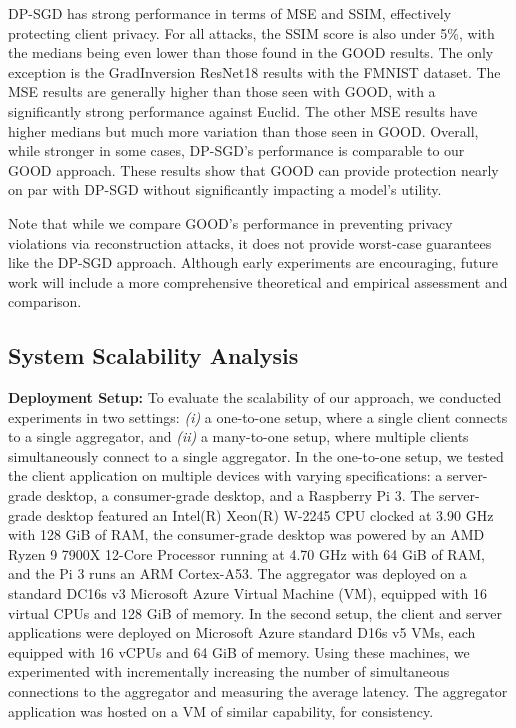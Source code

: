 {\color{black} DP-SGD has strong performance in terms of MSE and SSIM, effectively protecting client privacy. For all attacks, the SSIM score is also under 5\%, with the medians being even lower than those found in the GOOD results. The only exception is the GradInversion ResNet18 results with the FMNIST dataset. The MSE results are generally higher than those seen with GOOD, with a significantly strong performance against Euclid. The other MSE results have higher medians but much more variation than those seen in GOOD. %
Overall, while stronger in some cases, DP-SGD's performance is comparable to our GOOD approach. These results show that GOOD can provide protection nearly on par with DP-SGD without significantly impacting a model's utility.

Note that while we compare GOOD's performance in preventing privacy violations via reconstruction attacks, it does not provide worst-case guarantees like the DP-SGD approach. Although early experiments are encouraging, future work will include a more comprehensive theoretical and empirical assessment and comparison.}












\subsection{System Scalability Analysis}
\label{sec:eval-scalability}
{\bf Deployment Setup:} To evaluate the scalability of our approach, we conducted experiments in two settings: {\it (i)} a one-to-one setup, where a single client connects to a single aggregator, and {\it (ii)} a many-to-one setup, where multiple clients simultaneously connect to a single aggregator. In the one-to-one setup, we tested the client application on multiple devices with varying specifications: a server-grade desktop, a consumer-grade desktop, and a Raspberry Pi 3. The server-grade desktop featured an Intel(R) Xeon(R) W-2245 CPU clocked at 3.90 GHz with 128 GiB of RAM, the consumer-grade desktop was powered by an AMD Ryzen 9 7900X 12-Core Processor running at 4.70 GHz with 64 GiB of RAM, and the Pi 3 runs an ARM Cortex-A53. The aggregator was deployed on a standard DC16s v3 Microsoft Azure Virtual Machine (VM), equipped with 16 virtual CPUs and 128 GiB of memory.
In the second setup, the client and server applications were deployed on Microsoft Azure standard D16s v5 VMs, each equipped with 16 vCPUs and 64 GiB of memory. Using these machines, we experimented with incrementally increasing the number of simultaneous connections to the aggregator and measuring the average latency. The aggregator application was hosted on a VM of similar capability, for consistency.

